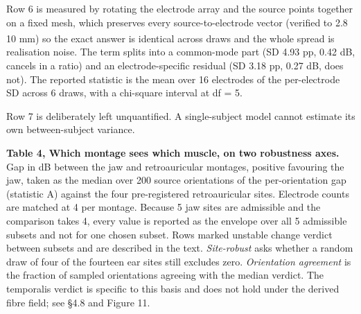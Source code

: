 \documentclass[
  11pt,
  a4paper,
]{article}
\begin{document}
Row 6 is measured by rotating the electrode array and the source points together
on a fixed mesh, which preserves every source-to-electrode vector (verified to
2.8 \texttimes{} 10\textsuperscript{} mm) so the exact answer is identical across draws and the whole
spread is realisation noise. The term splits into a common-mode part (SD
4.93 pp, 0.42 dB, cancels in a ratio) and an electrode-specific residual (SD
3.18 pp, 0.27 dB, does not). The reported statistic is the mean over 16
electrodes of the per-electrode SD across 6 draws, with a chi-square interval at
df = 5.

Row 7 is deliberately left unquantified. A single-subject model cannot estimate
its own between-subject variance.

\textbf{Table 4, Which montage sees which muscle, on two robustness axes.} Gap in dB
between the jaw and retroauricular montages, positive favouring the jaw, taken
as the median over 200 source orientations of the per-orientation gap (statistic
A) against the four pre-registered retroauricular sites. Electrode counts are
matched at 4 per montage. Because 5 jaw sites are admissible and the comparison
takes 4, every value is reported as the envelope over all 5 admissible subsets
and not for one chosen subset. Rows marked unstable change verdict between
subsets and are described in the text. \emph{Site-robust} asks whether a random draw
of four of the fourteen ear sites still excludes zero. \emph{Orientation agreement}
is the fraction of sampled orientations agreeing with the median verdict. The
temporalis verdict is specific to this basis and does not hold under the derived
fibre field; see \S{}4.8 and Figure 11.
\end{document}
